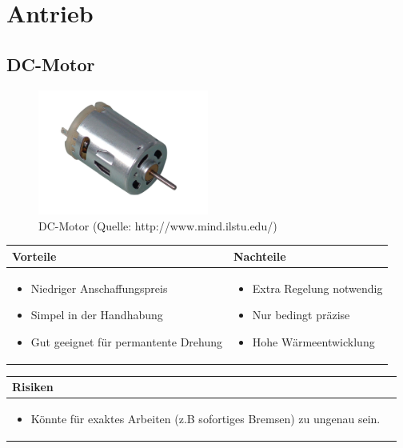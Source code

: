 
\section{Antrieb}


\subsection{DC-Motor}

\begin{figure}[h!]%
\centering
\includegraphics[width=0.5\textwidth]{fig/dcmotor.jpg}
\caption{DC-Motor (Quelle: http://www.mind.ilstu.edu/)}
\label{fig:Java}
\end{figure}

\begin{table}[h]
\begin{tabular}{p{} | p{}}


 \textbf{Vorteile} & \textbf{Nachteile} \\ \hline
	 
\begin{itemize}
\item Niedriger Anschaffungspreis
\item Simpel in der Handhabung
\item Gut geeignet für permantente Drehung
\end{itemize}

 
 &
 
\begin{itemize}
\item Extra Regelung notwendig
\item Nur bedingt präzise
\item Hohe Wärmeentwicklung
\end{itemize}

\end{tabular}
\end{table}

\begin{table}[h]
\begin{tabular}{p{}p{}}


 \textbf{Risiken} & \\ \hline
	 
\begin{itemize}
\item Könnte für exaktes Arbeiten (z.B sofortiges Bremsen) zu ungenau sein.
\end{itemize}

 
\end{tabular}
\end{table}

